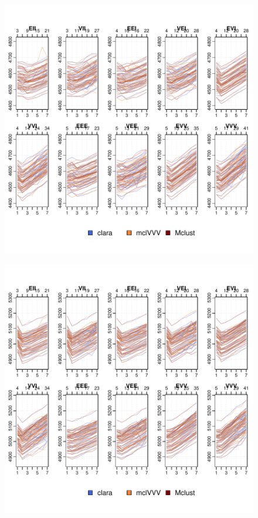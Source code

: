 \begin{figure}
    \centering
\includegraphics{App_plots-013}
\end{figure}

\begin{figure}
    \centering
\includegraphics{App_plots-014}
\end{figure}
